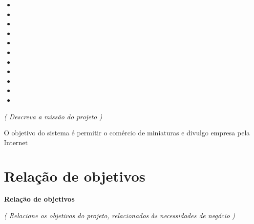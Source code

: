 \begin{itemize}

    \item {}
    \item {}
    \item {}
    \item {}
    \item {}
    \item {}

    \item {}    
    \item {}    
    \item {}    
    \item {}    
    \item {}    

\end{itemize}






\textit{ ( Descreva a missão do projeto ) }

O objetivo do sistema é permitir o comércio de miniaturas e divulgo empresa pela Internet


\section{Relação de objetivos}

\vskip 0.4cm
{\fontsize{18pt}{18pt} \selectfont \bf Relação de objetivos}
\vskip 0.2cm

\textit{ ( Relacione os objetivos do projeto, relacionados às necessidades de negócio ) }

